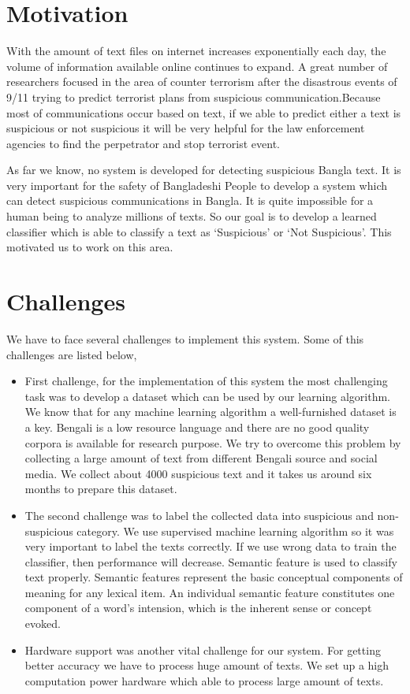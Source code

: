 \section{Motivation}
With the amount of text files on internet increases exponentially each day, the volume of information available online continues to expand. A great number of researchers focused in the area of counter terrorism after the disastrous events of  9/11 trying to predict terrorist plans from suspicious communication.Because most of communications occur based on text, if we able to predict either a text is suspicious or not suspicious it will be very helpful for the law enforcement agencies to find the perpetrator and stop terrorist event.\par 
\vspace{.3cm}
As far we know, no system is developed for detecting suspicious Bangla text. It is very important for the safety of Bangladeshi People to develop a system   which can detect suspicious communications in Bangla. It is quite impossible for a human being to analyze millions of texts. So our goal is to develop a learned classifier which is able to classify a text as ‘Suspicious’ or ‘Not Suspicious’. This motivated us to work on this area.

\section{Challenges}
We have to face several challenges to implement this system. Some of this challenges are listed below, 

\begin{itemize}
    \item First challenge, for the implementation of this system the most challenging task was to develop a dataset which can be used by our learning algorithm. We know that for any machine learning algorithm a well-furnished dataset is a key. Bengali is a low resource language and there are no good quality corpora is available for research purpose. We try to overcome this problem by collecting a large amount of text from different Bengali source and social media. We collect about 4000 suspicious text and it takes us around six months to prepare this dataset.
    
    \item The second challenge was to label the collected data into suspicious and non-suspicious category. We use supervised machine learning algorithm so it was very important to label the texts correctly. If we use wrong data to train the classifier, then performance will decrease. Semantic feature is used to classify text properly. Semantic features represent the basic conceptual components of meaning for any lexical item. An individual semantic feature constitutes one component of a word’s intension, which is the inherent sense or concept evoked.
    
    \item Hardware support was another vital challenge for our system. For getting better accuracy we have to process huge amount of texts. We set up a high computation power hardware which able to process large amount of texts.
\end{itemize}
\clearpage

